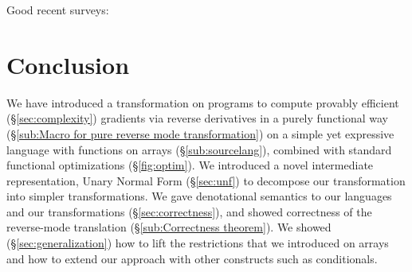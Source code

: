 
Good recent surveys: \cite{van2018automatic,baydin2017automatic}

\section{Conclusion}
\label{sec:conclusion}

We have introduced a transformation on programs to compute provably efficient (\S\ref{sec:complexity}) 
gradients via reverse derivatives in a purely functional way (\S\ref{sub:Macro for pure reverse mode transformation})
on a simple yet expressive language with functions on arrays (\S\ref{sub:sourcelang}), 
combined with standard functional optimizations (\S\ref{fig:optim}).  
We introduced a novel intermediate representation, Unary Normal Form (\S\ref{sec:unf}) 
to decompose our transformation into simpler transformations.
We gave denotational semantics to our languages and our transformations (\S\ref{sec:correctness}), 
and showed correctness of the reverse-mode translation (\S\ref{sub:Correctness theorem}).
We showed (\S\ref{sec:generalization}) how to lift the restrictions that
we introduced on arrays and how to extend our approach with other constructs such as conditionals.
\clearpage